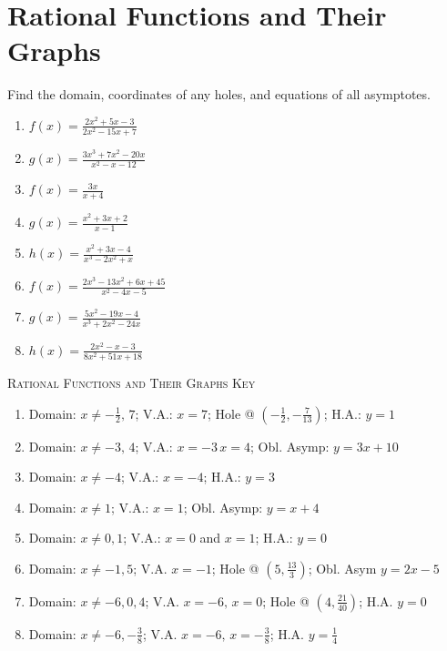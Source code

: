 \chapter{Rational Functions and Their Graphs}

Find the domain, coordinates of any holes, and equations of all asymptotes.
\begin{enumerate}
\setlength\itemsep{10pt}
	\item $f(x) = \frac{2x^2+5x-3}{2x^2-15x+7}$
	\item $g(x) = \frac{3x^3+7x^2-20x}{x^2-x-12}$
	\item $f(x) = \frac{3x}{x+4}$
	\item $g(x) = \frac{x^2+3x+2}{x-1}$
	\item $h(x) = \frac{x^2+3x-4}{x^3-2x^2+x}$
	\item $f(x) = \frac{2x^3-13x^2+6x+45}{x^2-4x-5}$
	\item $g(x) = \frac{5x^2-19x-4}{x^3+2x^2-24x}$
	\item $h(x) = \frac{2x^2-x-3}{8x^2+51x+18}$
\end{enumerate}

\newpage

\textsc{Rational Functions and Their Graphs Key}

\begin{enumerate}
    \item Domain: $x \neq -\frac{1}{2}, \, 7$; V.A.: $x=7$; Hole @ $\left(-\frac{1}{2},-\frac{7}{13}\right)$; H.A.: $y=1$
    \item Domain: $x \neq -3, \, 4$; V.A.: $x=-3 \, x = 4$; Obl. Asymp: $y = 3x+10$
    \item Domain: $x \neq -4$; V.A.: $x = -4$; H.A.: $y = 3$
    \item Domain: $x \neq 1$; V.A.: $x = 1$; Obl. Asymp: $y = x + 4$
    \item Domain: $x \neq 0, 1$; V.A.: $x = 0$ and $x = 1$; H.A.: $y = 0$ 
    \item Domain: $x \neq -1, 5$; V.A. $x=-1$; Hole @ $\left(5, \frac{13}{3}\right)$; Obl. Asym $y = 2x-5$
    \item Domain: $x \neq -6, 0, 4$; V.A. $x = -6, \, x = 0$; Hole @ $\left(4, \frac{21}{40}\right)$; H.A. $y = 0$
    \item Domain: $x \neq -6, -\frac{3}{8}$; V.A. $x = -6, \, x = -\frac{3}{8}$; H.A. $y = \frac{1}{4}$
\end{enumerate}